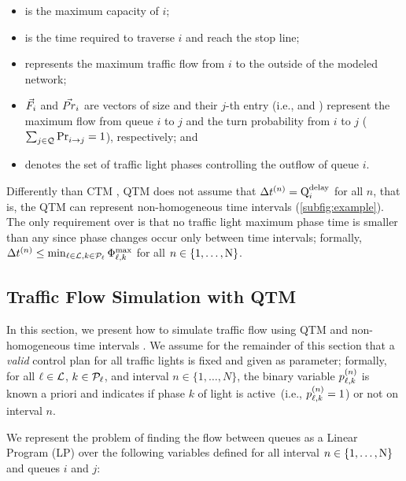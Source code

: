 \begin{itemize}
%
\item {} is the maximum capacity of $i$;
%
\item {} is the time required to traverse $i$ and reach the stop line;
%
\item {} represents the maximum traffic flow from $i$ to the outside of
  the modeled network;
%
\item $\Fvec_i$ and $\Prvec_i$ are vectors of size \Qn and their $j$-th entry
  (i.e.,  and ) represent the maximum flow from queue $i$
  to $j$ and the turn probability from $i$ to $j$ ($\sum_{j \in
  \Qset}\FTURN{i}{j} = 1$), respectively; and
%
\item {} denotes the set of traffic light phases controlling the outflow
  of queue $i$.
%
\end{itemize}


Differently than CTM \cite{daganzo1994cell,lin2004enhanced}, QTM does not assume
that $\DT[n] = \QDELAY{i}$ for all $n$, that is, the QTM can represent
non-homogeneous time intervals (\cref{subfig:example}).
%
The only requirement over \DT[n] is that no traffic light maximum phase time is
smaller than any \DT[n] since phase changes occur only between time intervals;
formally, $\DT[n] \le \min_{\tl \in \Lset, k \in \Pset_\tl} \PTMAX{\tl}{k}$ for
all $n \in \{1,\dots,\Nn\}$.
%



\subsection{Traffic Flow Simulation with QTM}\label{sec:lp}

In this section, we present how to simulate traffic flow using QTM and
non-homogeneous time intervals \DT[].
%
We assume for the remainder of this section that a \emph{valid} control plan for
all traffic lights is fixed and given as parameter;
%
formally, for all $\tl \in \Lset$, $k \in \Pset_\tl$, and interval $n \in
\{1,\dots,N\}$, the binary variable $\p{\tl}{k}$ is known a priori and indicates
if phase $k$ of light \tl is active~(i.e., $\p{\tl}{k} = 1$) or not on interval
$n$.


We represent the problem of finding the flow between queues as a Linear Program
(LP) over the following variables defined for all interval $n \in
\{1,\dots,\Nn\}$ and queues $i$ and $j$:

